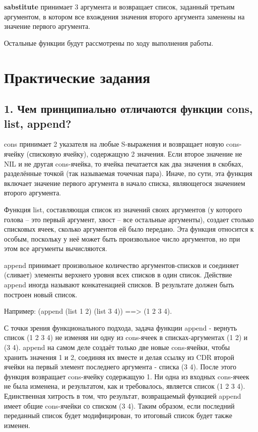 \documentclass[12pt]{report}
\begin{document}
\textbf{sabstitute} принимает 3 аргумента и возвращает список, заданный третьим аргументом, в котором все вхождения значения второго аргумента заменены на значение первого аргумента.

Остальные функции будут рассмотрены по ходу выполнения работы.



	
\chapter*{Практические задания}	

\section*{1. Чем принципиально отличаются функции cons, list, append?}

cons принимает 2 указателя на любые S-выражения и возвращает новую cons-ячейку (списковую ячейку), содержащую 2 значения. Если второе значение не NIL и не другая cons-ячейка, то ячейка печатается как два значения в скобках, разделённые точкой (так называемая точечная пара). Иначе, по сути, эта функция включает значение первого аргумента в начало списка, являющегося значением второго аргумента. 

Функция list, составляющая список из значений своих аргументов (у которого голова -- это первый аргумент, хвост -- все остальные аргументы), создает столько списковых ячеек, сколько аргументов ей было передано. Эта функция относится к особым, поскольку у неё может быть произвольное число аргументов, но при этом все аргументы вычисляются.

append принимает произвольное количество аргументов-списков и соединяет (сливает)  элементы верхнего уровня всех списков в один список. Действие append иногда называют конкатенацией списков. В результате должен быть построен новый список.

Например: (append (list 1 2) (list 3 4)) ==> (1 2 3 4). 

С точки зрения функционального подхода, задача функции append - вернуть список (1 2 3 4) не изменяя ни одну из cons-ячеек в списках-аргументах (1 2) и (3 4). append на самом деле создаёт только две новые cons-ячейки, чтобы хранить значения 1 и 2, соединяя их вместе и делая ссылку из CDR второй ячейки на первый элемент последнего аргумента - списка (3 4). После этого функция возвращает cons-ячейку содержащую 1. Ни одна из входных cons-ячеек не была изменена, и результатом, как и требовалось, является список (1 2 3 4). Единственная хитрость в том, что результат, возвращаемый функцией append имеет общие cons-ячейки со списком (3 4). Таким образом, если последний переданный список будет модифицирован, то  итоговый список будет также изменен.
\end{document}
